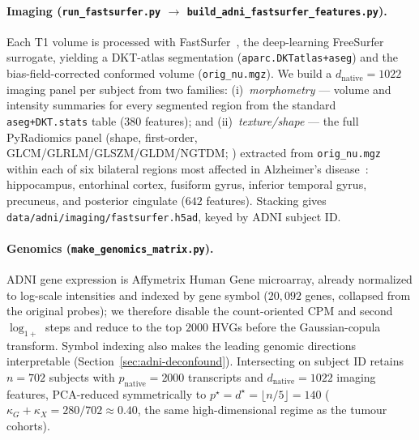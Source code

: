 \documentclass{article}
\begin{document}
\paragraph{Imaging
(\texttt{run\_fastsurfer.py} $\to$ \texttt{build\_adni\_fastsurfer\_features.py}).}
Each T1 volume is processed with
FastSurfer~\citep{henschel2020fastsurfer}, the deep-learning FreeSurfer
surrogate, yielding a DKT-atlas segmentation (\texttt{aparc.DKTatlas+aseg}) and
the bias-field-corrected conformed volume (\texttt{orig\_nu.mgz}). We build a
$d_{\mathrm{native}} = 1022$ imaging panel per subject from two families:
(i)~\emph{morphometry} --- volume and intensity summaries for every segmented
region from the standard \texttt{aseg+DKT.stats} table ($380$ features); and
(ii)~\emph{texture/shape} --- the full PyRadiomics panel
(shape, first-order, GLCM/GLRLM/GLSZM/GLDM/NGTDM;
\citealp{vangriethuysen2017pyradiomics}) extracted from \texttt{orig\_nu.mgz}
within each of six bilateral regions most affected in Alzheimer's
disease~\citep{braak1991staging}: hippocampus, entorhinal cortex, fusiform
gyrus, inferior temporal gyrus, precuneus, and posterior cingulate
($642$ features). Stacking gives
\texttt{data/adni/imaging/fastsurfer.h5ad}, keyed by ADNI subject ID.

\paragraph{Genomics (\texttt{make\_genomics\_matrix.py}).}
ADNI gene expression is Affymetrix Human Gene microarray, already normalized to
log-scale intensities and indexed by gene symbol ($20{,}092$ genes, collapsed
from the original probes); we therefore disable the count-oriented CPM and second
$\log_{1+}$ steps and reduce to the top $2000$ HVGs before the Gaussian-copula
transform. Symbol indexing also makes the leading genomic directions
interpretable (Section~\ref{sec:adni-deconfound}). Intersecting on subject ID
retains $n = 702$ subjects with
$p_{\mathrm{native}} = 2000$ transcripts and $d_{\mathrm{native}} = 1022$
imaging features, PCA-reduced symmetrically to
$p^\star = d^\star = \lfloor n/5 \rfloor = 140$
($\kappa_G + \kappa_X = 280/702 \approx 0.40$, the same high-dimensional regime
as the tumour cohorts).
\end{document}

